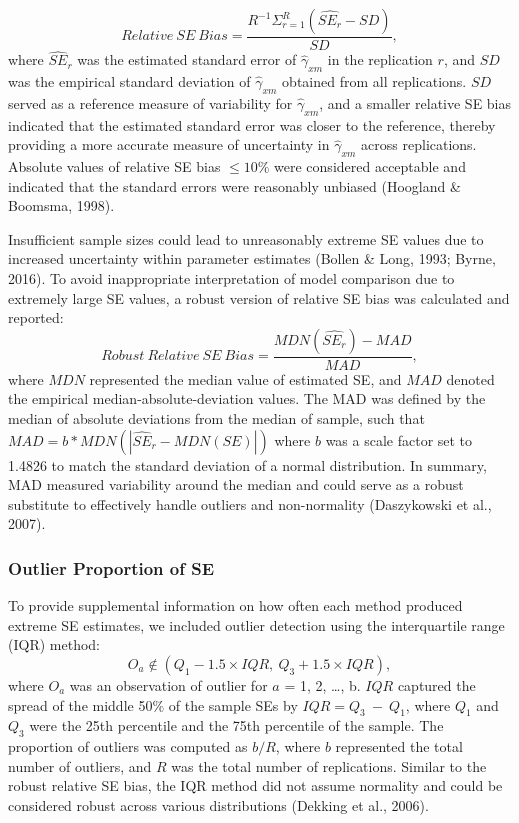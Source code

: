 \documentclass[
  man,mask]{apa6}
\begin{document}
\begin{equation}
Relative\ SE\ Bias = \frac{R^{-1}\Sigma^{R}_{r = 1}(\widehat{SE_{r}} - SD)}{SD},
\end{equation}
where \(\widehat{SE}_{r}\) was the estimated standard error of \(\hat{\gamma}_{xm}\) in the replication \(r\), and \(SD\) was the empirical standard deviation of \(\hat{\gamma}_{xm}\) obtained from all replications. \(SD\) served as a reference measure of variability for \(\hat{\gamma}_{xm}\), and a smaller relative SE bias indicated that the estimated standard error was closer to the reference, thereby providing a more accurate measure of uncertainty in \(\hat{\gamma}_{xm}\) across replications. Absolute values of relative SE bias \(\le 10\%\) were considered acceptable and indicated that the standard errors were reasonably unbiased (Hoogland \& Boomsma, 1998).

Insufficient sample sizes could lead to unreasonably extreme SE values due to increased uncertainty within parameter estimates (Bollen \& Long, 1993; Byrne, 2016). To avoid inappropriate interpretation of model comparison due to extremely large SE values, a robust version of relative SE bias was calculated and reported:
\begin{equation}
Robust\ Relative\ SE\ Bias = \frac{MDN(\widehat{SE_{r}}) - MAD}{MAD},
\end{equation}
where \(MDN\) represented the median value of estimated SE, and \(MAD\) denoted the empirical median-absolute-deviation values. The MAD was defined by the median of absolute deviations from the median of sample, such that \(MAD = b*MDN(|\widehat{SE}_{r} - MDN(SE)|)\) where \(b\) was a scale factor set to 1.4826 to match the standard deviation of a normal distribution. In summary, MAD measured variability around the median and could serve as a robust substitute to effectively handle outliers and non-normality (Daszykowski et al., 2007).

\subsubsection{Outlier Proportion of SE}\label{outlier-proportion-of-se}

To provide supplemental information on how often each method produced extreme SE estimates, we included outlier detection using the interquartile range (IQR) method:
\begin{equation}
O_{a} \not\in (Q_{1} - 1.5 \times IQR, \ Q_{3} + 1.5 \times IQR),
\end{equation}
where \(O_{a}\) was an observation of outlier for \(a\) = 1, 2, \ldots, b. \(IQR\) captured the spread of the middle 50\(\%\) of the sample SEs by \(IQR = Q_{3} \ - \ Q_{1}\), where \(Q_{1}\) and \(Q_{3}\) were the 25th percentile and the 75th percentile of the sample. The proportion of outliers was computed as \(b/R\), where \(b\) represented the total number of outliers, and \(R\) was the total number of replications. Similar to the robust relative SE bias, the IQR method did not assume normality and could be considered robust across various distributions (Dekking et al., 2006).
\end{document}
